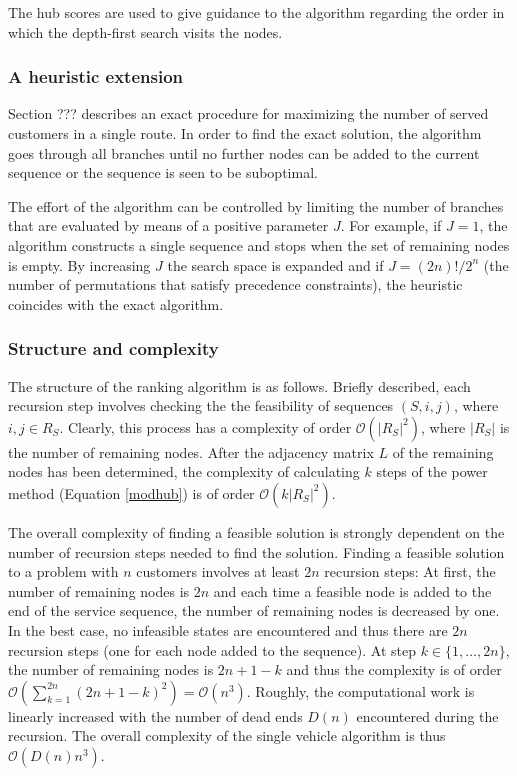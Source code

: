 \documentclass[dissertation,draft*]{aaltoseries}
\begin{document}
The hub scores are used to give guidance to the algorithm regarding the order in which the 
depth-first search visits the nodes. 

\subsubsection{A heuristic extension}
\label{rrheuristic}
Section ??? describes an exact procedure for maximizing the number of served customers
in a single route. In order to find the exact solution, the algorithm goes through all
branches until no further nodes can be added to the current sequence or the sequence is seen to be suboptimal.

The effort of the algorithm can be controlled by limiting the number of branches that are evaluated
by means of a positive parameter $J$. For example, if $J=1$, the algorithm constructs a single sequence
and stops when the set of remaining nodes is empty. By increasing $J$ the search space is expanded and
if $J = (2n)!/2^n$ (the number of permutations that satisfy precedence constraints), the heuristic
coincides with the exact algorithm.


\subsubsection{Structure and complexity}
\label{rrstructure}
The structure of the ranking algorithm is as follows. 
Briefly described, each recursion step involves checking the the feasibility
of sequences $(S,i,j)$, where $i,j \in R_S$.
Clearly, this process has a complexity of order $\mathcal{O} (|R_S|^2)$,
where $|R_S|$ is the number of remaining nodes. 
After the adjacency matrix $L$ of the remaining nodes has been determined, the complexity of 
calculating $k$ steps of the power method (Equation \eqref{modhub}) is of order $\mathcal{O} (k |R_S|^2)$.

The overall complexity of finding a feasible solution is strongly dependent on the number of recursion
steps needed to find the solution. 
Finding a feasible solution to a problem with $n$ customers involves at least $2n$
recursion steps: At first, the number of remaining nodes is $2n$ and each time 
a feasible node is added to the end of the service sequence, the 
number of remaining nodes is decreased by one.
In the best case, no infeasible states are encountered and thus there are $2n$ recursion steps 
(one for each node added to the sequence).
At step $k \in \{1,\ldots,2n\}$, the number of remaining nodes is $2n+1-k$
and thus the complexity is of order $\mathcal{O} (\sum_{k=1}^{2n} (2n+1-k)^2) =\mathcal{O}(n^3)$.
Roughly, the computational work is linearly increased with the 
number of dead ends $D(n)$ encountered during the recursion.
The overall complexity of the single vehicle algorithm is thus $\mathcal{O}(D(n)n^3)$.
\end{document}
